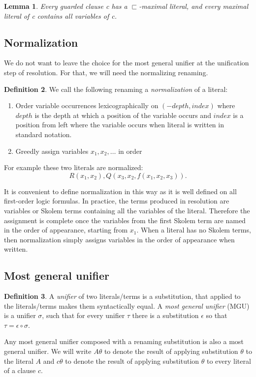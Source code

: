 \documentclass[english, shortabstract]{iithesis}
\theoremstyle{definition} \newtheorem{definition}{Definition}[chapter]
\theoremstyle{remark} \newtheorem{remark}[definition]{Observation}
\theoremstyle{plain} \newtheorem{theorem}[definition]{Theorem}
\theoremstyle{plain} \newtheorem{lemma}[definition]{Lemma}
\begin{document}
\begin{lemma}\label{lem:guarded}
Every guarded clause c has a $\sqsubset$-maximal literal, and every maximal literal
of c contains all variables of c.
\end{lemma}

\subsection{Normalization}
We do not want to leave the choice for the most general unifier at the unification step of resolution.
For that, we will need the normalizing renaming.

\begin{definition}
We call the following renaming a \emph{normalization} of a literal:
\begin{enumerate}
    \item Order variable occurrences lexicographically on $(-\mathit{depth}, \mathit{index})$ 
    where $\mathit{depth}$ is the depth at which a position of the variable occurs and $\mathit{index}$ is a position from left where the variable occurs when literal is written in standard notation.
    \item Greedly assign variables $x_1, x_2, \dots$ in order
\end{enumerate}
\end{definition}

For example these two literals are normalized: $$R(x_1,x_2), Q(x_3, x_2, f(x_1,x_2, x_3)).$$

It is convenient to define normalization in this way as it is well defined on all first-order logic formulas.
In practice, the terms produced in resolution are variables or Skolem terms containing all the variables of the literal.
Therefore the assignment is complete once the variables from the first Skolem term are named in the order of appearance, starting from $x_1$.
When a literal has no Skolem terms, then normalization simply assigns variables in the order of appearance when written.

\subsection{Most general unifier}
\begin{definition}\label{def:mgu}
A \emph{unifier} of two literals/terms is a substitution, that applied to the literals/terms makes them syntactically equal. 
A \emph{most general unifier} (MGU) is a unifier $\sigma$, such that for every unifier $\tau$ there is a substitution $\epsilon$ so that $\tau=\epsilon\circ\sigma$.
\end{definition}
Any most general unifier composed with a renaming substitution is also a most general unifier.
We will write $A\theta$ to denote the result of applying substitution $\theta$ to the literal $A$
and $c\theta$ to denote the result of applying substitution $\theta$ to every literal of a clause $c$.
\end{document}
